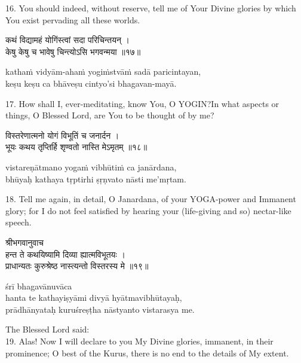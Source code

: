 16. You should indeed, without reserve, tell me of Your Divine glories by which
You exist pervading all these worlds.

\begin{gitaverse}
कथं विद्यामहं योगिंस्त्वां सदा परिचिन्तयन् । \\
केषु केषु च भावेषु चिन्त्योऽसि भगवन्मया ॥१७॥
\end{gitaverse}

\begin{transliteration}
kathaṁ vidyām-ahaṁ yogiṁstvāṁ sadā paricintayan, \\
keṣu keṣu ca bhāveṣu cintyo'si bhagavan-mayā.
\end{transliteration}

17. How shall I, ever-meditating, know You, O YOGIN?\@ In what aspects or
things, O Blessed Lord, are You to be thought of by me?

\begin{gitaverse}
विस्तरेणात्मनो योगं विभूतिं च जनार्दन । \\
भूयः कथय तृप्तिर्हि शृण्वतो नास्ति मेऽमृतम् ॥१८॥
\end{gitaverse}

\begin{transliteration}
vistareṇātmano yogaṁ vibhūtiṁ ca janārdana, \\
bhūyaḥ kathaya tṛptirhi ṣṛṇvato nāsti me'mṛtam.
\end{transliteration}

18. Tell me again, in detail, O Janardana, of your YOGA-power and Immanent
glory; for I do not feel satisfied by hearing your (life-giving and so)
nectar-like speech.

\begin{gitaverse}
श्रीभगवानुवाच \\
हन्त ते कथयिष्यामि दिव्या ह्यात्मविभूतयः । \\
प्राधान्यतः कुरुश्रेष्ठ नास्त्यन्तो विस्तरस्य मे ॥१९॥
\end{gitaverse}

\begin{transliteration}
śrī bhagavānuvāca \\
hanta te kathayiṣyāmi divyā hyātmavibhūtayaḥ, \\
prādhānyataḥ kuruśreṣṭha nāstyanto vistarasya me.
\end{transliteration}

The Blessed Lord said: \\
19. Alas! Now I will declare to you My Divine glories, immanent, in their
prominence; O best of the Kurus, there is no end to the details of My extent.

